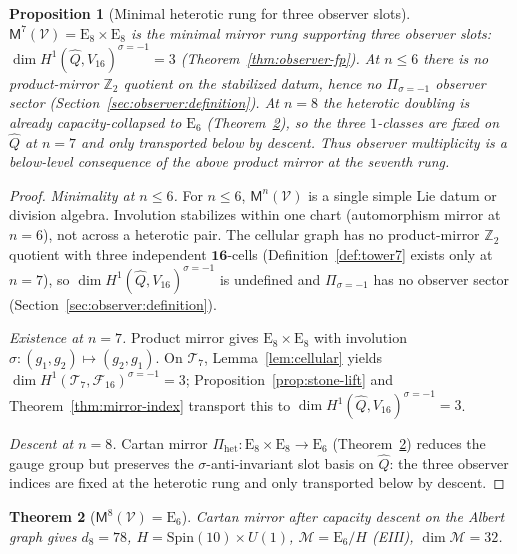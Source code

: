 \documentclass[aps,prd,onecolumn,amsmath,amssymb,nofootinbib,11pt]{revtex4-2}
\numberwithin{equation}{section}
\theoremstyle{plain}
\newtheorem{theorem}{Theorem}[section]
\newtheorem{proposition}[theorem]{Proposition}
\theoremstyle{definition}
\theoremstyle{remark}
\newcommand{\E}[1]{\mathrm{E}_{#1}}
\newcommand{\Spin}{\mathrm{Spin}}
\newcommand{\Void}{\mathcal{V}}
\newcommand{\Mirror}{\mathsf{M}}
\begin{document}
\begin{proposition}[Minimal heterotic rung for three observer slots]\label{prop:climb:minimal-heterotic}
$\Mirror^7(\Void)=\E{8}\times\E{8}$ is the \emph{minimal} mirror rung supporting
three observer slots: $\dim H^1(\hat Q,V_{16})^{\sigma=-1}=3$
(Theorem~\ref{thm:observer-fp}). At $n\leq6$ there is no product-mirror
$\mathbb{Z}_2$ quotient on the stabilized datum, hence no
$\Pi_{\sigma=-1}$ observer sector (Section~\ref{sec:observer:definition}). At
$n=8$ the heterotic doubling is already capacity-collapsed to $\E{6}$
(Theorem~\ref{thm:e6}), so the three $1$-classes are fixed on $\hat Q$ at
$n=7$ and only transported below by descent. Thus observer multiplicity is a
\emph{below}-level consequence of the \emph{above} product mirror at the
seventh rung.
\end{proposition}

\begin{proof}
\emph{Minimality at $n\leq6$.}
For $n\leq6$, $\Mirror^n(\Void)$ is a single simple Lie datum or division
algebra. Involution stabilizes within one chart (automorphism mirror at $n=6$),
not across a heterotic pair. The cellular graph has no product-mirror
$\mathbb{Z}_2$ quotient with three independent $\mathbf{16}$-cells
(Definition~\ref{def:tower7} exists only at $n=7$), so
$\dim H^1(\hat Q,V_{16})^{\sigma=-1}$ is undefined and
$\Pi_{\sigma=-1}$ has no observer sector
(Section~\ref{sec:observer:definition}).

\emph{Existence at $n=7$.}
Product mirror gives $\E{8}\times\E{8}$ with involution
$\sigma:(g_1,g_2)\mapsto(g_2,g_1)$. On $\mathcal{T}_7$,
Lemma~\ref{lem:cellular} yields
$\dim H^1(\mathcal{T}_7,\mathcal{F}_{16})^{\sigma=-1}=3$; Proposition~\ref{prop:stone-lift}
and Theorem~\ref{thm:mirror-index} transport this to
$\dim H^1(\hat Q,V_{16})^{\sigma=-1}=3$.

\emph{Descent at $n=8$.}
Cartan mirror $\Pi_{\mathrm{het}}:\E{8}\times\E{8}\to\E{6}$
(Theorem~\ref{thm:e6}) reduces the gauge group but preserves the
$\sigma$-anti-invariant slot basis on $\hat Q$: the three observer indices are
fixed at the heterotic rung and only transported below by descent.
\end{proof}

\begin{theorem}[$\Mirror^8(\Void)=\E{6}$]\label{thm:e6}
Cartan mirror after capacity descent on the Albert graph gives $d_8=78$,
$H=\Spin(10)\times U(1)$, $\mathcal{M}=\E{6}/H$ (EIII), $\dim\mathcal{M}=32$.
\end{theorem}
\end{document}
